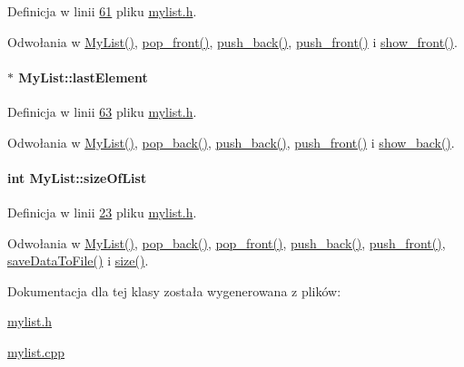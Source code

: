 Definicja w linii \hyperlink{mylist_8h_source_l00061}{61} pliku \hyperlink{mylist_8h_source}{mylist.\-h}.



Odwołania w \hyperlink{mylist_8cpp_source_l00011}{My\-List()}, \hyperlink{mylist_8cpp_source_l00053}{pop\-\_\-front()}, \hyperlink{mylist_8cpp_source_l00025}{push\-\_\-back()}, \hyperlink{mylist_8cpp_source_l00034}{push\-\_\-front()} i \hyperlink{mylist_8cpp_source_l00079}{show\-\_\-front()}.

\hypertarget{class_my_list_a287894c4add6b52be99826fb4d76594c}{
\paragraph[{last\-Element}]{$\ast$ My\-List\-::last\-Element}}\label{class_my_list_a287894c4add6b52be99826fb4d76594c}


Definicja w linii \hyperlink{mylist_8h_source_l00063}{63} pliku \hyperlink{mylist_8h_source}{mylist.\-h}.



Odwołania w \hyperlink{mylist_8cpp_source_l00011}{My\-List()}, \hyperlink{mylist_8cpp_source_l00044}{pop\-\_\-back()}, \hyperlink{mylist_8cpp_source_l00025}{push\-\_\-back()}, \hyperlink{mylist_8cpp_source_l00034}{push\-\_\-front()} i \hyperlink{mylist_8cpp_source_l00082}{show\-\_\-back()}.

\hypertarget{class_my_list_a77b7870f617b51fad7399463c9147668}{
\paragraph[{size\-Of\-List}]{\setlength{\rightskip}{0pt plus 5cm}int My\-List\-::size\-Of\-List\hspace{0.3cm}{\ttfamily [private]}}}\label{class_my_list_a77b7870f617b51fad7399463c9147668}


Definicja w linii \hyperlink{mylist_8h_source_l00023}{23} pliku \hyperlink{mylist_8h_source}{mylist.\-h}.



Odwołania w \hyperlink{mylist_8cpp_source_l00011}{My\-List()}, \hyperlink{mylist_8cpp_source_l00044}{pop\-\_\-back()}, \hyperlink{mylist_8cpp_source_l00053}{pop\-\_\-front()}, \hyperlink{mylist_8cpp_source_l00025}{push\-\_\-back()}, \hyperlink{mylist_8cpp_source_l00034}{push\-\_\-front()}, \hyperlink{mylist_8cpp_source_l00095}{save\-Data\-To\-File()} i \hyperlink{mylist_8cpp_source_l00086}{size()}.



Dokumentacja dla tej klasy została wygenerowana z plików\-:\begin{DoxyCompactItemize}
\item 
\hyperlink{mylist_8h}{mylist.\-h}\item 
\hyperlink{mylist_8cpp}{mylist.\-cpp}\end{DoxyCompactItemize}
